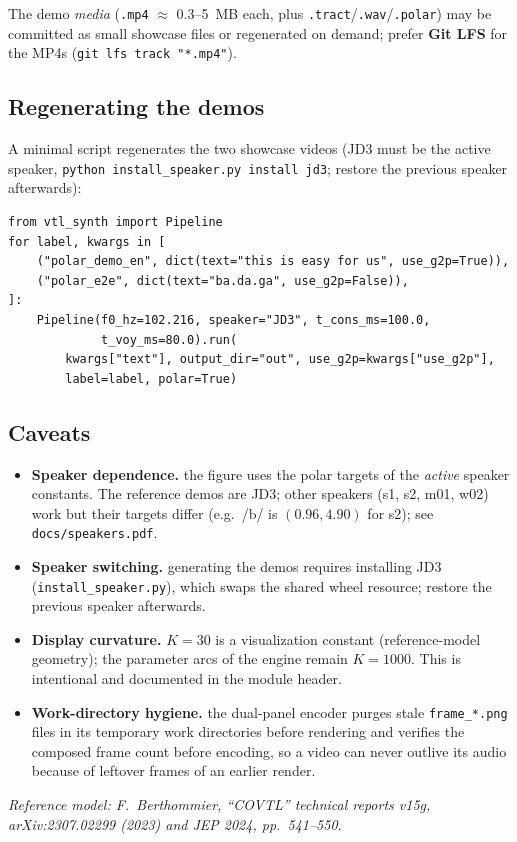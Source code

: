 \documentclass[11pt,a4paper]{article}
\newcommand{\code}[1]{\texttt{#1}}
\begin{document}
The demo \emph{media} (\code{.mp4} $\approx$ 0.3--5~MB each, plus
\code{.tract}/\code{.wav}/\code{.polar}) may be committed as small
showcase files or regenerated on demand; prefer \textbf{Git LFS} for
the MP4s (\code{git lfs track "*.mp4"}).

\subsection{Regenerating the demos}

A minimal script regenerates the two showcase videos (JD3 must be the
active speaker, \code{python install\_speaker.py install jd3}; restore
the previous speaker afterwards):

\begin{lstlisting}[style=python]
from vtl_synth import Pipeline
for label, kwargs in [
    ("polar_demo_en", dict(text="this is easy for us", use_g2p=True)),
    ("polar_e2e", dict(text="ba.da.ga", use_g2p=False)),
]:
    Pipeline(f0_hz=102.216, speaker="JD3", t_cons_ms=100.0,
             t_voy_ms=80.0).run(
        kwargs["text"], output_dir="out", use_g2p=kwargs["use_g2p"],
        label=label, polar=True)
\end{lstlisting}

\subsection{Caveats}

\begin{itemize}[leftmargin=1.4em]
\item \textbf{Speaker dependence.} the figure uses the polar targets
      of the \emph{active} speaker constants. The reference demos are
      JD3; other speakers (s1, s2, m01, w02) work but their targets
      differ (e.g.\ /b/ is $(0.96, 4.90)$ for s2); see
      \code{docs/speakers.pdf}.
\item \textbf{Speaker switching.} generating the demos requires
      installing JD3 (\code{install\_speaker.py}), which swaps the
      shared wheel resource; restore the previous speaker afterwards.
\item \textbf{Display curvature.} $K = 30$ is a visualization
      constant (reference-model geometry); the parameter arcs of the
      engine remain $K = 1000$. This is intentional and documented in
      the module header.
\item \textbf{Work-directory hygiene.} the dual-panel encoder purges
      stale \code{frame\_*.png} files in its temporary work
      directories before rendering and verifies the composed frame
      count before encoding, so a video can never outlive its audio
      because of leftover frames of an earlier render.
\end{itemize}

\vspace{1.5em}
\begin{center}
\small\emph{Reference model: F.~Berthommier, ``COVTL'' technical
reports v15g, arXiv:2307.02299 (2023) and JEP 2024, pp.~541--550.}
\end{center}
\end{document}
